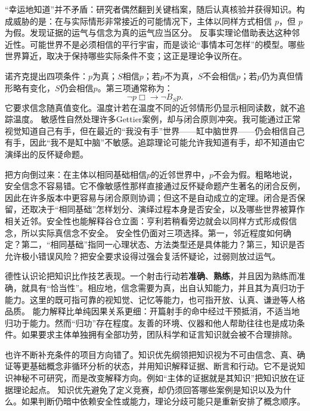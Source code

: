 “幸运地知道”并不矛盾：研究者偶然翻到关键档案，随后认真核验并获得知识。构成威胁的是：在与实际情形非常接近的可能情况下，主体以同样方式相信 $p$，但 $p$ 为假。发现证据的运气与信念为真的运气应当区分\parencite{pritchard2005}。 反事实理论借助表达这种邻近性。可能世界不是必须相信的平行宇宙，而是谈论“事情本可怎样”的模型。哪些世界算近，取决于保持哪些实际条件不变；这正是理论争议所在。

诺齐克提出四项条件：$p$为真；$S$相信$p$；若$p$不为真，$S$不会相信$p$；若$p$仍为真但情形略有变化，$S$仍会相信$p$\parencite{nozick1981}。第三项通常称为：
\[
\neg p \Box\!\!\to \neg B_Sp .
\]
它要求信念随真值变化。温度计若在温度不同的近邻情形仍显示相同读数，就不追踪温度。 敏感性自然处理许多Gettier案例，却与闭合原则冲突。我可能通过正常视觉知道自己有手，但在最近的“我没有手”世界——缸中脑世界——仍会相信自己有手，因此“我不是缸中脑”不敏感。追踪理论可能允许我知道有手，却不知道由它演绎出的反怀疑命题。

把方向倒过来：在主体以相同基础相信$p$的近邻世界中，$p$不会为假。粗略地说，安全信念不容易错。它不像敏感性那样直接通过反怀疑命题产生著名的闭合反例，因此在许多版本中更容易与闭合原则协调；但这不是自动成立的定理。闭合是否保留，还取决于“相同基础”怎样划分、演绎过程本身是否安全，以及哪些世界被算作相关近邻。安全性也能解释谷仓立面：亨利若稍看旁边就会以同样方式形成假信念，所以实际真信念不安全。 安全性仍面对三项选择。第一，邻近程度如何确定？第二，“相同基础”指同一心理状态、方法类型还是具体能力？第三，知识是否允许极小错误风险？把安全要求设得过强会复活怀疑论，过弱则放过运气。

德性认识论把知识比作技艺表现。一个射击行动若\textbf{准确}、\textbf{熟练}，并且因为熟练而准确，就具有“恰当性”。相应地，信念需要为真，出自认知能力，并且其为真归功于能力\parencite{sosa2007}。这里的既可指可靠的视知觉、记忆等能力，也可指开放、认真、谦逊等人格品质\parencite{zagzebski1996}。 能力解释比单纯因果关系更细：开篇射手的命中经过干预抵消，不适当地归功于能力。然而“归功”存在程度。友善的环境、仪器和他人帮助往往也是成功条件。如果要求主体单独拥有全部功劳，团队科学和证言知识就会被不合理排除。

也许不断补充条件的项目方向错了。知识优先纲领把知识视为不可由信念、真、确证等更基础概念非循环分析的状态，并用知识解释证据、断言和行动\parencite{williamson2000}。它不是说知识神秘不可研究，而是改变解释方向。例如“主体的证据就是其知识”把知识放在证据理论起点。 知识优先避免了定义竞赛，却仍须回答哪些案例是知识以及为什么。如果判断仍暗中依赖安全性或能力，理论分歧可能只是重新安排了概念顺序。

